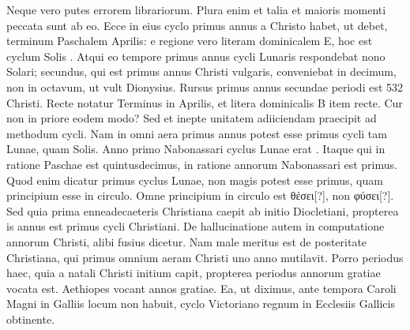 %
Neque vero putes errorem librariorum.
Plura enim et
talia et maioris momenti peccata sunt ab eo.
Ecce in eius cyclo primus
annus a Christo habet, ut debet, terminum Paschalem  Aprilis:
e regione vero literam dominicalem \textsc{E}, hoc est cyclum Solis
.
Atqui eo tempore primus annus cycli Lunaris respondebat
nono Solari; secundus, qui est primus annus Christi vulgaris,
conveniebat in decimum, non in octavum, ut vult Dionysius.
Rursus
primus annus secundae periodi est 532 Christi.
Recte notatur
Terminus in  Aprilis, et litera dominicalis \textsc{B} item recte.
Cur non
in priore eodem modo?
Sed et inepte unitatem adiiciendam praecipit
ad methodum cycli.
Nam in omni aera primus annus potest esse
primus cycli tam Lunae, quam Solis.
Anno primo Nabonassari cyclus
Lunae erat .
Itaque qui in ratione Paschae est quintusdecimus,
in ratione annorum Nabonassari est primus.
Quod enim dicatur
primus cyclus Lunae, non magis potest esse primus, quam principium
esse in circulo.
Omne principium in circulo est \textgreek{θέσει[?]}, non
\textgreek{φύσει[?]}.
Sed quia prima enneadecaeteris Christiana caepit ab initio Diocletiani,
propterea is annus est primus cycli Christiani.
De hallucinatione
autem in computatione annorum Christi, alibi fusius dicetur.
Nam male meritus est de posteritate Christiana, qui primus omnium
aeram Christi uno anno mutilavit.
Porro periodus haec, quia a
natali Christi initium capit, propterea periodus annorum gratiae vocata
est.
Aethiopes vocant annos gratiae.
Ea, ut diximus, ante tempora
Caroli Magni in Galliis locum non habuit, cyclo Victoriano
regnum in Ecclesiis Gallicis obtinente.
%
